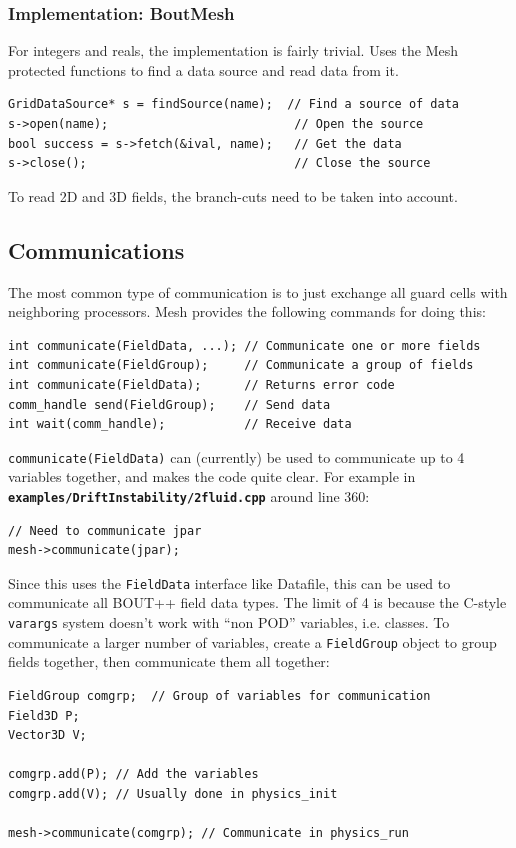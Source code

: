 \documentclass[12pt]{article}
\newcommand{\code}[1]{\texttt{#1}}
\newcommand{\file}[1]{\texttt{\bf #1}}
\begin{document}
\subsubsection{Implementation: BoutMesh}

For integers and reals, the implementation is fairly trivial. Uses
the Mesh protected functions to find a data source and read data from it.
\begin{lstlisting}
GridDataSource* s = findSource(name);  // Find a source of data
s->open(name);                          // Open the source
bool success = s->fetch(&ival, name);   // Get the data
s->close();                             // Close the source
\end{lstlisting}

To read 2D and 3D fields, the branch-cuts need to be taken into account.

\subsection{Communications}

The most common type of communication is to just exchange all
guard cells with neighboring processors. Mesh provides the following
commands for doing this:
\begin{lstlisting}
int communicate(FieldData, ...); // Communicate one or more fields
int communicate(FieldGroup);     // Communicate a group of fields
int communicate(FieldData);      // Returns error code
comm_handle send(FieldGroup);    // Send data
int wait(comm_handle);           // Receive data
\end{lstlisting}
\code{communicate(FieldData)} can (currently) be used to communicate
up to 4 variables together, and makes the code quite clear. For example in
\file{examples/DriftInstability/2fluid.cpp} around line 360:
\begin{lstlisting}
// Need to communicate jpar
mesh->communicate(jpar);
\end{lstlisting}
Since this uses the \code{FieldData} interface like Datafile, this can
be used to communicate all BOUT++ field data types. The limit of 4 is
because the C-style \code{varargs} system doesn't work with ``non POD''
variables, i.e. classes. To communicate a larger number of variables,
create a \code{FieldGroup} object to group fields together, then communicate
them all together:
\begin{lstlisting}
FieldGroup comgrp;  // Group of variables for communication
Field3D P;
Vector3D V;

comgrp.add(P); // Add the variables
comgrp.add(V); // Usually done in physics_init

mesh->communicate(comgrp); // Communicate in physics_run
\end{lstlisting}
\end{document}
